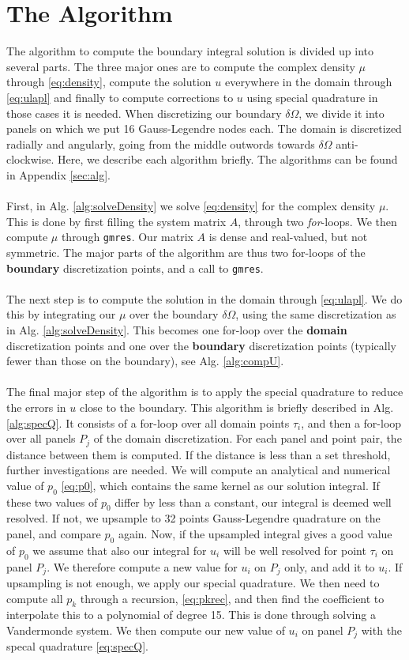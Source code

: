 \documentclass[a4paper,10pt]{article}
\def\code#1{\texttt{#1}}
\begin{document}
\section*{The Algorithm}
The algorithm to compute the boundary integral solution is divided up into several parts. The three major ones are to compute the complex density $\mu$ through \eqref{eq:density}, compute the solution $u$ everywhere in the domain through \eqref{eq:ulapl} and finally to compute corrections to $u$ using special quadrature in those cases it is needed. When discretizing our boundary $\delta\Omega$, we divide it into panels on which we put 16 Gauss-Legendre nodes each. The domain is discretized radially and angularly, going from the middle outwords towards $\delta\Omega$ anti-clockwise. Here, we describe each algorithm briefly. The algorithms can be found in Appendix \ref{sec:alg}. 
\\ \\
First, in Alg. \ref{alg:solveDensity} we solve \eqref{eq:density} for the complex density $\mu$. This is done by first filling the system matrix $A$, through two \textit{for}-loops. We then compute $\mu$ through \code{gmres}. Our matrix $A$ is dense and real-valued, but not symmetric. The major parts of the algorithm are thus two for-loops of the \textbf{boundary} discretization points, and a call to \texttt{gmres}.
\\ \\
The next step is to compute the solution in the domain through \eqref{eq:ulapl}. We do this by integrating our $\mu$ over the boundary $\delta\Omega$, using the same discretization as in Alg. \ref{alg:solveDensity}. This becomes one for-loop over the \textbf{domain} discretization points and one over the \textbf{boundary} discretization points (typically fewer than those on the boundary), see Alg. \ref{alg:compU}.
\\ \\
The final major step of the algorithm is to apply the special quadrature  to reduce the errors in $u$ close to the boundary. This algorithm is briefly described in Alg. \ref{alg:specQ}. It consists of a for-loop over all domain points $\tau_i$, and then a for-loop over all panels $P_j$ of the domain discretization. For each panel and point pair, the distance between them is computed. If the distance is less than a set threshold, further investigations are needed. We will compute an analytical and numerical value of $p_0$ \eqref{eq:p0}, which contains the same kernel as our solution integral. If these two values of $p_0$ differ by less than a constant, our integral is deemed well resolved. If not, we upsample to 32 points Gauss-Legendre quadrature on the panel, and compare $p_0$ again. Now, if the upsampled integral gives a good value of $p_0$ we assume that also our integral for $u_i$ will be well resolved for point $\tau_i$ on panel $P_j$. We therefore compute a new value for $u_i$ on $P_j$ only, and add it to $u_i$. If upsampling is not enough, we apply our special quadrature. We then need to compute all $p_k$ through a recursion, \eqref{eq:pkrec}, and then find the coefficient to interpolate this to a polynomial of degree 15. This is done through solving a Vandermonde system. We then compute our new value of $u_i$ on panel $P_j$ with the specal quadrature \eqref{eq:specQ}. 
\end{document}
